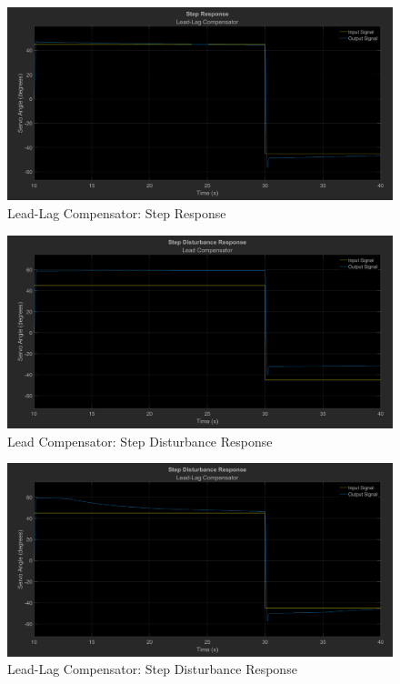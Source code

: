 \documentclass[12pt]{article}
\begin{document}
\begin{figure}[h!]
    \centering
    \includegraphics[width=\textwidth]{step_leadlag}
    \caption{\label{fig:step_leadlag}Lead-Lag Compensator: Step Response}
\end{figure}

\begin{figure}[h!]
	\centering
    \includegraphics[width=\textwidth]{dist_lead}
    \caption{\label{fig:dist_lead}Lead Compensator: Step Disturbance Response}
\end{figure}

\begin{figure}[h!]
    \centering
    \includegraphics[width=\textwidth]{dist_leadlag}
    \caption{\label{fig:dist_leadlag}Lead-Lag Compensator: Step Disturbance Response}
\end{figure}
\end{document}
